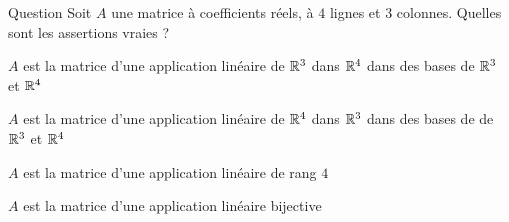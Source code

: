 \begin{multi}[multiple,feedback=
{\(A\) est la matrice d'une application linéaire \(f: \Rr^3 \to \Rr^4\) dans des bases de  \(\Rr^3\) et \(\Rr^4\).  
D'après le théorème du rang, le rang d'une telle application est au plus \(3\).
\vskip0mm
Comme \(A\) n'est pas une matrice carrée, \(A\) n'est pas inversible et donc si \(f\) est une application linéaire de matrice \(A\), \(f\) n'est pas bijective.
}]{Question}
Soit \(A\) une matrice à coefficients réels, à \(4\) lignes et \(3\) colonnes. Quelles sont les assertions vraies ?

    \item* \(A\) est la matrice d'une application linéaire de \(\Rr^3\) dans \(\Rr^4\) dans des bases de \(\Rr^3\) et \(\Rr^4\)
    \item \(A\) est la matrice d'une application linéaire de \(\Rr^4\) dans \(\Rr^3\) dans des bases de de \(\Rr^3\) et \(\Rr^4\)
    \item \(A\) est la matrice d'une application linéaire de rang \(4\)
    \item \(A\) est la matrice d'une application linéaire bijective
\end{multi}


